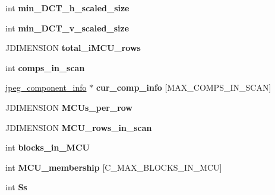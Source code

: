\begin{DoxyCompactItemize}
int {\bfseries min\+\_\+\+D\+C\+T\+\_\+h\+\_\+scaled\+\_\+size}
\item 
\mbox{\label{structjpeg__compress__struct_a5d63d182b17f0885fcabf88c6a08a9a5}} 
int {\bfseries min\+\_\+\+D\+C\+T\+\_\+v\+\_\+scaled\+\_\+size}
\item 
\mbox{\label{structjpeg__compress__struct_aef01162f4c66434929f933a40e695f9e}} 
J\+D\+I\+M\+E\+N\+S\+I\+ON {\bfseries total\+\_\+i\+M\+C\+U\+\_\+rows}
\item 
\mbox{\label{structjpeg__compress__struct_a3387358088abbec1c8838499966c8f06}} 
int {\bfseries comps\+\_\+in\+\_\+scan}
\item 
\mbox{\label{structjpeg__compress__struct_a1cacb367b7d69227d3086ff105bca9ab}} 
\hyperlink{structjpeg__component__info}{jpeg\+\_\+component\+\_\+info} $\ast$ {\bfseries cur\+\_\+comp\+\_\+info} \mbox{[}M\+A\+X\+\_\+\+C\+O\+M\+P\+S\+\_\+\+I\+N\+\_\+\+S\+C\+AN\mbox{]}
\item 
\mbox{\label{structjpeg__compress__struct_a97f0c5e0ae932d1810007077443da684}} 
J\+D\+I\+M\+E\+N\+S\+I\+ON {\bfseries M\+C\+Us\+\_\+per\+\_\+row}
\item 
\mbox{\label{structjpeg__compress__struct_ab605396740a26114095bf99c7c7349fb}} 
J\+D\+I\+M\+E\+N\+S\+I\+ON {\bfseries M\+C\+U\+\_\+rows\+\_\+in\+\_\+scan}
\item 
\mbox{\label{structjpeg__compress__struct_ac32cf016a916984f68f158e5310a16bb}} 
int {\bfseries blocks\+\_\+in\+\_\+\+M\+CU}
\item 
\mbox{\label{structjpeg__compress__struct_a6debf977451892aae1116b47c5c1c95f}} 
int {\bfseries M\+C\+U\+\_\+membership} \mbox{[}C\+\_\+\+M\+A\+X\+\_\+\+B\+L\+O\+C\+K\+S\+\_\+\+I\+N\+\_\+\+M\+CU\mbox{]}
\item 
\mbox{\label{structjpeg__compress__struct_adda4b7ef0dda94b38b6e34df42769d81}} 
int {\bfseries Ss}
\item 

\end{DoxyCompactItemize}
